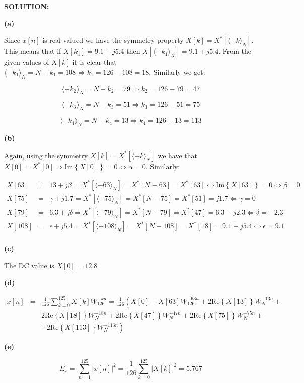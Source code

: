 \documentclass[a4paper,11pt,oneside]{article}
\begin{document}
\vspace{1cm}
\textbf{SOLUTION:}

\textbf{(a)}

Since $x[n]$ is real-valued we have the symmetry property $X[k]=X^*[\langle-k\rangle_N]$. This means that if $X[k_1]=9.1-j5.4$ then $X[\langle-k_1\rangle_N]=9.1+j5.4$. From the given values of $X[k]$ it is clear that $\langle-k_1\rangle_N=N-k_1=108\Rightarrow k_1=126-108=18$. Similarly we get:

\[
\langle-k_2\rangle_N=N-k_2=79\Rightarrow k_2=126-79=47
\] 

\[
\langle-k_3\rangle_N=N-k_3=51\Rightarrow k_3=126-51=75
\] 

\[
\langle-k_4\rangle_N=N-k_4=13\Rightarrow k_4=126-13=113
\] 



\textbf{(b)}

Again, using the symmetry $X[k]=X^*[\langle-k\rangle_N]$ we have that $X[0]=X^*[0]\Rightarrow \textrm{Im}\left\{X[0]\right\}=0\Leftrightarrow \alpha=0$. Similarly:

\[
\begin{array}{lll}
X[63]&=&13+j\beta = X^*[\langle -63\rangle_N]=X^*[N-63]=X^*[63] \Leftrightarrow \textrm{Im}\left\{X[63]\right\}=0 \Leftrightarrow \beta=0\\
X[75]&=&\gamma+j1.7=X^*[\langle-75\rangle_N]=X^*[N-75]=X^*[51]=j1.7\Leftrightarrow \gamma=0\\
X[79]&=&6.3+j\delta=X^*[\langle-79\rangle_N]=X^*[N-79]=X^*[47]=6.3-j2.3\Leftrightarrow \delta=-2.3\\
X[108]&=&\epsilon+j5.4=X^*[\langle-108\rangle_N]=X^*[N-108]=X^*[18]=9.1+j5.4\Leftrightarrow \epsilon=9.1\\
\end{array}
\]


\textbf{(c)}

The DC value is $X[0]=12.8$

\textbf{(d)}

\[
\begin{array}{lll}
x[n] &=& \frac{1}{126}\sum_{k=0}^{125}X[k]W_{126}^{-kn}=\frac{1}{126}\left(X[0]+X[63]W_{126}^{-63n}+2\textrm{Re}\left\{X[13]\right\}W_{N}^{-13n}+\right.\\
&&\left. 2\textrm{Re}\left\{X[18]\right\}W_{N}^{-18n}+2\textrm{Re}\left\{X[47]\right\}W_{N}^{-47n}+2\textrm{Re}\left\{X[75]\right\}W_{N}^{-75n} +\right.\\
&&\left.+2\textrm{Re}\left\{X[113]\right\}W_{N}^{-113n}\right)
\end{array}
\]

\textbf{(e)}


\[
E_x=\sum_{n=1}^{125}|x[n]|^2=\frac{1}{126}\sum_{k=0}^{125} |X[k]|^2=5.767
\]

\end{document}
